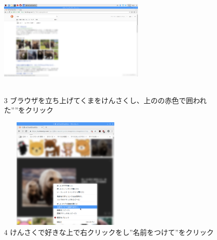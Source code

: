 \documentclass[a4paper,12pt]{jarticle}
\begin{document}
\begin{figure}[t]
  \begin{minipage}{\textwidth}
    \begin{minipage}{7.033cm}
      \includegraphics[width=7.049cm,height=5.554cm]{textbook-img096.png}\\
      3 ブラウザを立ち上げてくまをけんさくし、上のの赤色で囲われた””をクリック
    \end{minipage}
    \begin{minipage}{3.582cm}
    \end{minipage}
    \begin{minipage}{6.582cm}
      \includegraphics[width=6.468cm,height=5.406cm]{textbook-img095.png}\\
      4 けんさくで好きな上で右クリックをし”名前をつけて”をクリック
    \end{minipage}
  \end{minipage}


\end{figure}
\end{document}
